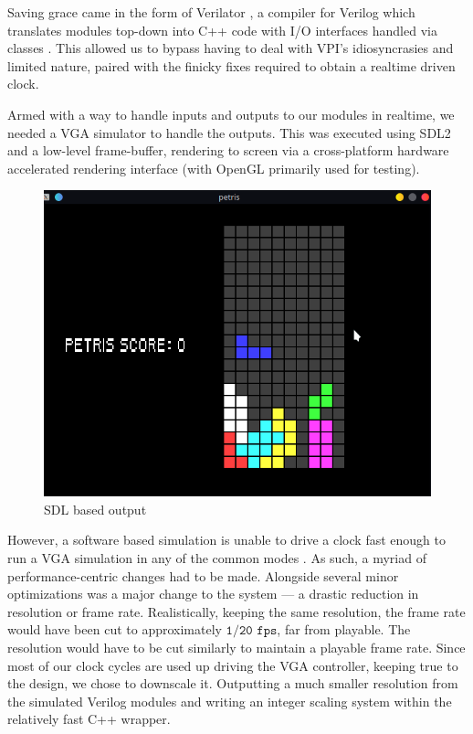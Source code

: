 Saving grace came in the form of Verilator \cite{verilator}, a compiler for
Verilog which translates modules top-down into C++ code with
I/O interfaces handled via classes \cite{verilator-implement}. This allowed
us to bypass having to deal with VPI's idiosyncrasies and limited nature, paired
with the finicky fixes required to obtain a realtime driven clock.

Armed with a way to handle inputs and outputs to our modules in realtime, we 
needed a VGA simulator to handle the outputs. This was executed using
SDL2 \cite{sdl2} and a low-level frame-buffer, rendering to screen via 
a cross-platform hardware accelerated rendering interface (with OpenGL \cite{opengl}
primarily used for testing).

\begin{figure}[h]
    \centering
    \includegraphics[scale=0.6]{fig/ouput_screenshot.png}
    \caption{SDL based output}
\label{fig:output}
\end{figure}

However, a software based simulation is unable to drive a clock fast enough
to run a VGA simulation in any of the common modes \cite{vga_modes}. As such,
a myriad of performance-centric changes had to be made. Alongside several
minor optimizations was a major change to the system --- a drastic reduction in
resolution or frame rate. Realistically, keeping the same resolution, the frame 
rate would have been cut to approximately \(\texttt{1/20 fps}\), far from playable.
The resolution would have to be cut similarly to maintain a playable frame rate.
Since most of our clock cycles are used up driving the VGA controller, keeping true
to the design, we chose to downscale it. Outputting a much smaller resolution from
the simulated Verilog modules and writing an integer scaling \cite{intscale} system
within the relatively fast C++ wrapper. 

